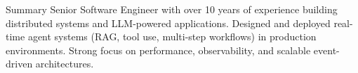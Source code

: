 \documentclass{resume}
\begin{document}

\begin{rSection}{Summary}
Senior Software Engineer with over 10 years of experience building distributed systems and LLM-powered applications. Designed and deployed real-time agent systems (RAG, tool use, multi-step workflows) in production environments. Strong focus on performance, observability, and scalable event-driven architectures.
\end{rSection}

\end{document}
